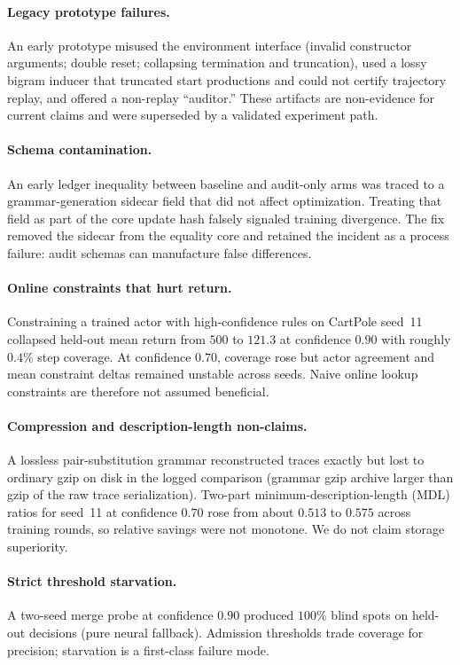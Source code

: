 \documentclass[11pt,a4paper]{article}
\begin{document}
\paragraph{Legacy prototype failures.}
An early prototype misused the environment interface (invalid constructor arguments; double reset; collapsing termination and truncation), used a lossy bigram inducer that truncated start productions and could not certify trajectory replay, and offered a non-replay ``auditor.''
These artifacts are non-evidence for current claims and were superseded by a validated experiment path.

\paragraph{Schema contamination.}
An early ledger inequality between baseline and audit-only arms was traced to a grammar-generation sidecar field that did not affect optimization.
Treating that field as part of the core update hash falsely signaled training divergence.
The fix removed the sidecar from the equality core and retained the incident as a process failure: audit schemas can manufacture false differences.

\paragraph{Online constraints that hurt return.}
Constraining a trained actor with high-confidence rules on CartPole seed~11 collapsed held-out mean return from \(500\) to \(121.3\) at confidence \(0.90\) with roughly \(0.4\%\) step coverage.
At confidence \(0.70\), coverage rose but actor agreement and mean constraint deltas remained unstable across seeds.
Naive online lookup constraints are therefore not assumed beneficial.

\paragraph{Compression and description-length non-claims.}
A lossless pair-substitution grammar reconstructed traces exactly but lost to ordinary gzip on disk in the logged comparison (grammar gzip archive larger than gzip of the raw trace serialization).
Two-part minimum-description-length (MDL) ratios for seed~11 at confidence \(0.70\) rose from about \(0.513\) to \(0.575\) across training rounds, so relative savings were not monotone.
We do not claim storage superiority.

\paragraph{Strict threshold starvation.}
A two-seed merge probe at confidence \(0.90\) produced \(100\%\) blind spots on held-out decisions (pure neural fallback).
Admission thresholds trade coverage for precision; starvation is a first-class failure mode.
\end{document}
